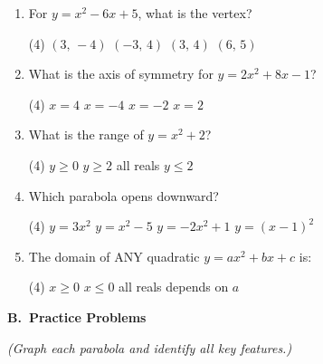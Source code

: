 \documentclass[12pt,letterpaper]{article}
\newcommand{\worksheetsubsection}[1]{%
  \vspace{4pt}%
  {\noindent\small\bfseries\color{navyblue}#1}\par\vspace{2pt}%
}
\begin{document}
\begin{enumerate}[label=\textbf{\arabic*.}, leftmargin=*, itemsep=10pt]

  \item For $y = x^2 - 6x + 5$, what is the vertex?
  \begin{tasks}(4)
    \task $(3,\,-4)$
    \task $(-3,\,4)$
    \task $(3,\,4)$
    \task $(6,\,5)$
  \end{tasks}

  \item What is the axis of symmetry for $y = 2x^2 + 8x - 1$?
  \begin{tasks}(4)
    \task $x=4$
    \task $x=-4$
    \task $x=-2$
    \task $x=2$
  \end{tasks}

  \item What is the range of $y = x^2 + 2$?
  \begin{tasks}(4)
    \task $y \ge 0$
    \task $y \ge 2$
    \task all reals
    \task $y \le 2$
  \end{tasks}

  \item Which parabola opens downward?
  \begin{tasks}(4)
    \task $y = 3x^2$
    \task $y = x^2-5$
    \task $y = -2x^2+1$
    \task $y = (x-1)^2$
  \end{tasks}

  \item The domain of ANY quadratic $y = ax^2+bx+c$ is:
  \begin{tasks}(4)
    \task $x \ge 0$
    \task $x \le 0$
    \task all reals
    \task depends on $a$
  \end{tasks}

\end{enumerate}

\vspace{6pt}
\worksheetsubsection{B.\ Practice Problems} \textit{(Graph each parabola and identify all key features.)}
\end{document}
